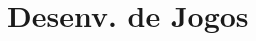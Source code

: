 \documentclass{beamer}
\begin{document}
\section{Desenv. de Jogos}
\subsection{}

% 
% 
% 
\end{document}
